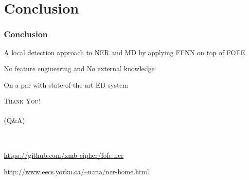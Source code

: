 \documentclass{beamer}
\begin{document}
\section{Conclusion}
\begin{frame}
\frametitle{Conclusion}
\begin{block}{}
	A local detection approach to NER and MD by applying FFNN on top of FOFE
\end{block}
\begin{block}{}
	No feature engineering and No external knowledge
\end{block}
\begin{block}{}
	On a par with state-of-the-art ED system
\end{block}
\end{frame}


\appendix

\begin{frame}
\begin{center}
{\huge \textsc{Thank You!}}\\
\ \\
{\huge \textsc{(Q\&A)}}
\ \\
\ \\
\ \\
\begin{description}
	\small
	\item[code] \url{https://github.com/xmb-cipher/fofe-ner}
	\item[demo] \url{http://www.eecs.yorku.ca/~nana/ner-home.html}
\end{description}
\end{center}
\end{frame}

\begin{frame}
\printbibliography[heading=none]
\end{frame}
\end{document}
